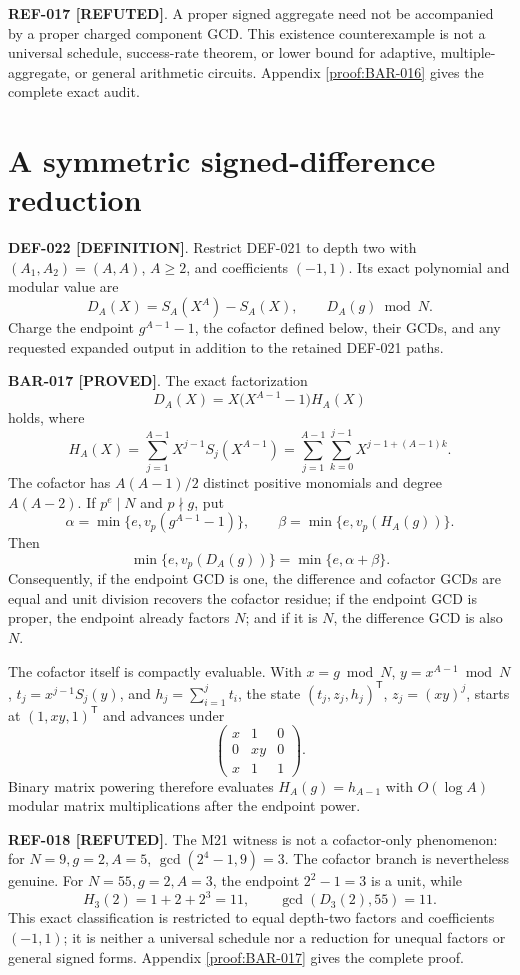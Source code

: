 \documentclass[11pt]{article}
\newcommand{\claimstatus}[2]{\textbf{#1 [#2]}}
\begin{document}
\claimstatus{REF-017}{REFUTED}. A proper signed aggregate need not be
accompanied by a proper charged component GCD. This existence counterexample
is not a universal schedule, success-rate theorem, or lower bound for
adaptive, multiple-aggregate, or general arithmetic circuits.
Appendix \ref{proof:BAR-016} gives the complete exact audit.

\section{A symmetric signed-difference reduction}

\claimstatus{DEF-022}{DEFINITION}. Restrict DEF-021 to depth two with
\((A_1,A_2)=(A,A)\), \(A\ge2\), and coefficients \((-1,1)\). Its exact
polynomial and modular value are
\[
D_A(X)=S_A(X^A)-S_A(X),\qquad D_A(g)\bmod N.
\]
Charge the endpoint \(g^{A-1}-1\), the cofactor defined below, their GCDs,
and any requested expanded output in addition to the retained DEF-021 paths.

\claimstatus{BAR-017}{PROVED}. The exact factorization
\[
D_A(X)=X\bigl(X^{A-1}-1\bigr)H_A(X)
\]
holds, where
\[
H_A(X)=\sum_{j=1}^{A-1}X^{j-1}S_j(X^{A-1})
      =\sum_{j=1}^{A-1}\sum_{k=0}^{j-1}
        X^{j-1+(A-1)k}.
\]
The cofactor has \(A(A-1)/2\) distinct positive monomials and degree
\(A(A-2)\). If \(p^e\mid N\) and \(p\nmid g\), put
\[
\alpha=\min\{e,v_p(g^{A-1}-1)\},\qquad
\beta=\min\{e,v_p(H_A(g))\}.
\]
Then
\[
\min\{e,v_p(D_A(g))\}=\min\{e,\alpha+\beta\}.
\]
Consequently, if the endpoint GCD is one, the difference and cofactor GCDs
are equal and unit division recovers the cofactor residue; if the endpoint
GCD is proper, the endpoint already factors \(N\); and if it is \(N\), the
difference GCD is also \(N\).

The cofactor itself is compactly evaluable. With \(x=g\bmod N\),
\(y=x^{A-1}\bmod N\), \(t_j=x^{j-1}S_j(y)\), and
\(h_j=\sum_{i=1}^{j}t_i\), the state
\((t_j,z_j,h_j)^\mathsf{T}\), \(z_j=(xy)^j\), starts at
\((1,xy,1)^\mathsf{T}\) and advances under
\[
\begin{pmatrix}
x&1&0\\
0&xy&0\\
x&1&1
\end{pmatrix}.
\]
Binary matrix powering therefore evaluates \(H_A(g)=h_{A-1}\) with
\(O(\log A)\) modular matrix multiplications after the endpoint power.

\claimstatus{REF-018}{REFUTED}. The M21 witness is not a cofactor-only
phenomenon: for \(N=9,g=2,A=5\),
\(\gcd(2^4-1,9)=3\). The cofactor branch is nevertheless genuine. For
\(N=55,g=2,A=3\), the endpoint \(2^2-1=3\) is a unit, while
\[
H_3(2)=1+2+2^3=11,\qquad \gcd(D_3(2),55)=11.
\]
This exact classification is restricted to equal depth-two factors and
coefficients \((-1,1)\); it is neither a universal schedule nor a reduction
for unequal factors or general signed forms. Appendix \ref{proof:BAR-017}
gives the complete proof.
\end{document}
